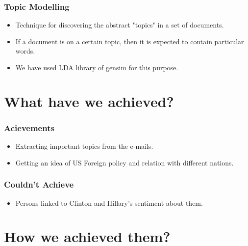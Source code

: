 \documentclass{beamer}
\begin{document}

\begin{frame}
	\frametitle{Topic Modelling}
	\begin{itemize}
		\item Technique for discovering the abstract "topics" in a set of documents.
		\item If a document is on a certain topic, then it is expected to contain particular words.
		\item We have used LDA library of gensim for this purpose.
	\end{itemize}
\end{frame}


\section{What have we achieved?}


\begin{frame}
	\frametitle{Acievements}
	\begin{itemize}
		\item Extracting important topics from the e-mails.
		\item Getting an idea of US Foreign policy and relation with different nations.
	\end{itemize}
\end{frame}


\begin{frame}
	\frametitle{Couldn't Achieve}
	\begin{itemize}
		\item Persons linked to Clinton and Hillary's sentiment about them.
	\end{itemize}
\end{frame}


\section{How we achieved them?}
\end{document}
